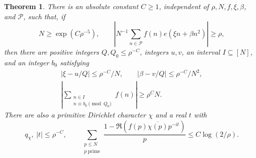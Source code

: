 \documentclass[twoside]{aomart}
\theoremstyle{paperplain}
\newtheorem{theorem}{Theorem}[section]
\theoremstyle{paperdefinition}
\numberwithin{equation}{section}
\begin{document}
\begin{samepage}
\begin{theorem}\label{thm:scalar_inverse}
There is an absolute constant $C\ge1$, independent of
$\rho,N,f,\xi,\beta$, and $\mathcal P$, such that, if
\begin{equation*}
 N\ge\exp(C\rho^{-5}),\qquad
 \left|N^{-1}\sum_{n\in\mathcal P}
          f(n)e(\xi n+\beta n^2)\right|\ge\rho,
\end{equation*}
then there are positive integers $Q,Q_0\le\rho^{-C}$,
integers $u,v$, an interval $I\subseteq[N]$, and an integer $b_0$ satisfying
\begin{gather}
 |\xi-u/Q|\le\rho^{-C}/N,\qquad
 |\beta-v/Q|\le\rho^{-C}/N^2,
 \label{sc:dense-bsz-scalar-major-arcs}\\
 \left|\sum_{\substack{n\in I\\n\equiv b_0\pmod{Q_0}}}f(n)\right|
 \ge\rho^C N.
 \label{sc:dense-bsz-scalar-periodic-mean}
\end{gather}
There are also a primitive Dirichlet character $\chi$ and a real $t$ with
\begin{equation}
 q_\chi,\ |t|\le\rho^{-C},\qquad
 \sum_{\substack{p\le N\\p\ \mathrm{prime}}}\frac{1-\Re(f(p)\overline{\chi(p)}p^{-it})}{p}
 \le C\log(2/\rho).
 \label{sc:dense-bsz-scalar-pretentious}
\end{equation}
\end{theorem}
\end{samepage}
\end{document}
